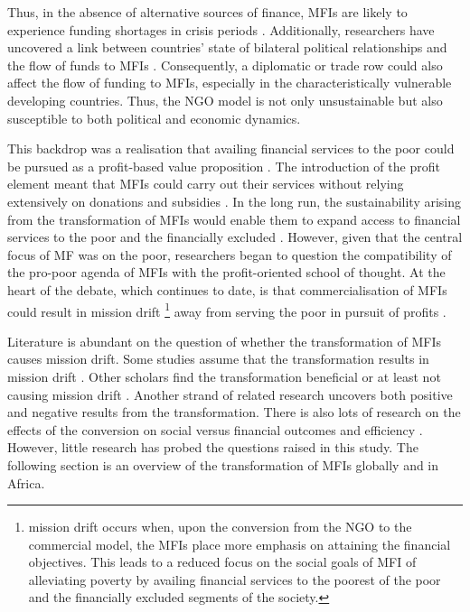 \documentclass[a4paper, nobind]{templates/ociamthesis}
\begin{document}
Thus, in the absence of alternative sources of finance, MFIs are likely to experience funding shortages in crisis periods \autocite{constantinou2011financial}. Additionally, researchers have uncovered a link between countries' state of bilateral political relationships and the flow of funds to MFIs \autocite{garmaise2013cheap}. Consequently, a diplomatic or trade row could also affect the flow of funding to MFIs, especially in the characteristically vulnerable developing countries. Thus, the NGO model is not only unsustainable but also susceptible to both political and economic dynamics.

This backdrop was a realisation that availing financial services to the poor could be pursued as a profit-based value proposition \autocite{rhyne1999microfinance}. The introduction of the profit element meant that MFIs could carry out their services without relying extensively on donations and subsidies \autocite{duvendack2015mis}. In the long run, the sustainability arising from the transformation of MFIs would enable them to expand access to financial services to the poor and the financially excluded \autocite{brown2012microfinance,sarma2011ngo}. However, given that the central focus of MF was on the poor, researchers began to question the compatibility of the pro-poor agenda of MFIs with the profit-oriented school of thought. At the heart of the debate, which continues to date, is that commercialisation of MFIs could result in mission drift \footnote{mission drift occurs when, upon the conversion from the NGO to the commercial model, the MFIs place more emphasis on attaining the financial objectives. This leads to a reduced focus on the social goals of MFI of alleviating poverty by availing financial services to the poorest of the poor and the financially excluded segments of the society.} away from serving the poor in pursuit of profits \autocite{im2015profits,mia2017mission}.

Literature is abundant on the question of whether the transformation of MFIs causes mission drift. Some studies assume that the transformation results in mission drift \autocite{mia2017mission,wagenaar2012institutional,lopatta2017sustainable,roberts2013endogeneity}. Other scholars find the transformation beneficial or at least not causing mission drift \autocite{im2015profits,lutzenkirchen2012microfinance,quayes2012depth,mersland2010microfinance}. Another strand of related research uncovers both positive and negative results from the transformation\autocite{kar2012does,caudill2009microfinance}. There is also lots of research on the effects of the conversion on social versus financial outcomes and efficiency \autocite{bogan2012capital,kar2012does,tchuigoua2014institutional,khachatryan2017performance}. However, little research has probed the questions raised in this study. The following section is an overview of the transformation of MFIs globally and in Africa.
\end{document}
